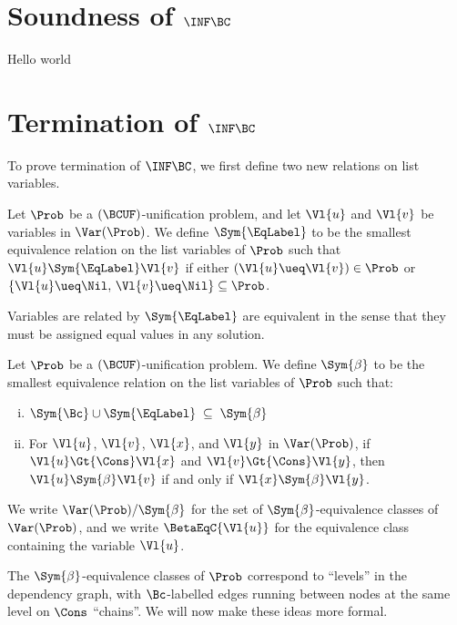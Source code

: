\section{Soundness of $\INF\BC$}

Hello world

\section{Termination of $\INF\BC$}

To prove termination of $\INF\BC$, we first define two new relations on list
variables.

\begin{Definition}
    Let $\Prob$ be a $(\BCUF)$-unification problem, and let $\Vl{u}$ and
    $\Vl{v}$ be variables in $\Var(\Prob)$. We define $\Sym{\EqLabel}$ to be
    the smallest equivalence relation on the list variables of $\Prob$ such
    that $\Vl{u} \Sym{\EqLabel} \Vl{v}$ if either $(\Vl{u} \ueq \Vl{v}) \in
    \Prob$ or $\{\Vl{u} \ueq \Nil, \, \Vl{v} \ueq \Nil\} \subseteq \Prob$.
\end{Definition}

Variables are related by $\Sym{\EqLabel}$ are equivalent in the sense that they
must be assigned equal values in any solution.

\begin{Definition}
    Let $\Prob$ be a $(\BCUF)$-unification problem. We define $\Sym{\beta}$ to
    be the smallest equivalence relation on the list variables of $\Prob$ such
    that:
    \begin{enumerate}[(i)]
        \item ${\Sym{\Bc}} \cup {\Sym{\EqLabel}} \; \subseteq \; {\Sym{\beta}}$
        \item For $\Vl{u}$, $\Vl{v}$, $\Vl{x}$, and $\Vl{y}$ in $\Var(\Prob)$,
            if $\Vl{u} \Gt{\Cons} \Vl{x}$ and $\Vl{v} \Gt{\Cons} \Vl{y}$, then
            $\Vl{u} \Sym{\beta} \Vl{v}$ if and only if $\Vl{x} \Sym{\beta}
            \Vl{y}$.
    \end{enumerate}

    We write $\Var(\Prob)/{\Sym{\beta}}$ for the set of
    $\Sym{\beta}$-equivalence classes of $\Var(\Prob)$, and we write
    $\BetaEqC{\Vl{u}}$ for the equivalence class containing the variable
    $\Vl{u}$.
\end{Definition}

The $\Sym{\beta}$-equivalence classes of $\Prob$ correspond to ``levels'' in
the dependency graph, with $\Bc$-labelled edges running between nodes at the
same level on $\Cons$ ``chains''. We will now make these ideas more formal.

